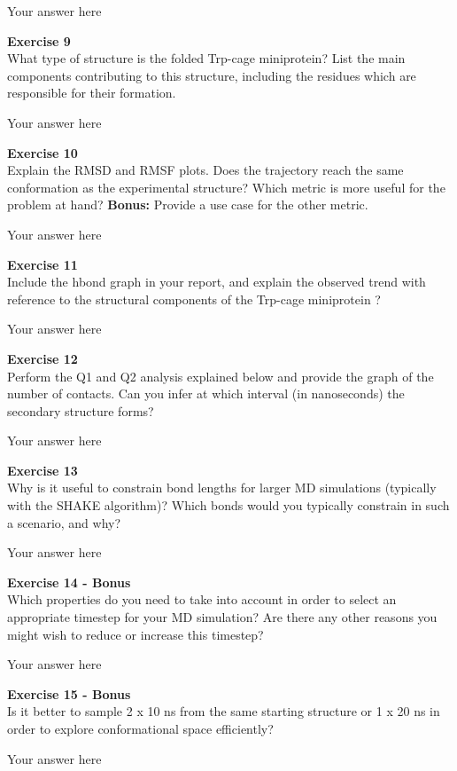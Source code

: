 \documentclass{article}
\begin{document}
Your answer here

\begin{mdframed}
\textbf{Exercise 9}\\
What type of structure is the folded Trp-cage miniprotein? List the main components contributing to this structure, including the residues which are responsible for their formation.
\end{mdframed}

Your answer here

\begin{mdframed}
\textbf{Exercise 10}\\
Explain the RMSD and RMSF plots.  Does the trajectory reach the same conformation as the experimental structure?
Which metric is more useful for the problem at hand? \textbf{Bonus:}  Provide a use case for the other metric.
\end{mdframed}

Your answer here

\begin{mdframed}
\textbf{Exercise 11}\\
Include the hbond graph in your report, and explain the observed trend with reference to the structural components of the Trp-cage miniprotein ?
\end{mdframed}

Your answer here

\begin{mdframed}
\textbf{Exercise 12}\\
Perform the Q1 and Q2 analysis explained below and provide the graph of the number of contacts. Can you infer at which interval (in nanoseconds) the secondary structure forms?
\end{mdframed}

Your answer here

\begin{mdframed}
\textbf{Exercise 13}\\
Why is it useful to constrain bond lengths for larger MD simulations (typically with the SHAKE algorithm)? Which bonds would you typically constrain in such a scenario, and why?
\end{mdframed}

Your answer here

\begin{mdframed}
\textbf{Exercise 14 - Bonus}\\
Which properties do you need to take into account in order to select an appropriate timestep for your MD simulation? Are there any other reasons you might wish to reduce or increase this timestep?
\end{mdframed}

Your answer here

\begin{mdframed}
\textbf{Exercise 15 - Bonus}\\
Is it better to sample 2 x 10 ns from the same starting structure or 1 x 20 ns in order to explore conformational space efficiently?
\end{mdframed}

Your answer here
\end{document}
